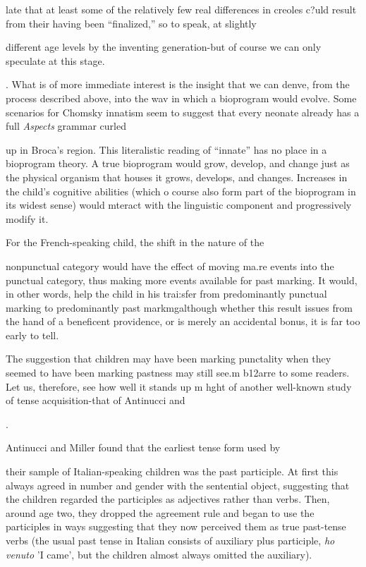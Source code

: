 late that at least some of the relatively few real differences in creoles c?uld result from their having been ``finalized,'' so to speak, at slightly

different age levels by the inventing generation-but of course we can only speculate at this stage.

. What is of more immediate interest is the insight that we can denve, from the process described above, into the wav in which a bio\-program would evolve. Some scenarios for Chomsky innatism seem to suggest that every neonate already has a full \textit{Aspects} grammar curled


up in Broca's region. This literalistic reading of ``innate'' has no place in a bioprogram theory. A true bioprogram would grow, develop, and change just as the physical organism that houses it grows, develops, and changes. Increases in the child's cognitive abilities (which o course also form part of the bioprogram in its widest sense) would mteract with the linguistic component and progressively modify it.

For the French-speaking child, the shift in the nature of the

nonpunctual category would have the effect of moving ma.re events into the punctual category, thus making more events available for past marking. It would, in other words, help the child in his trai:sfer from predominantly punctual marking to predominantly past markmg\-although whether this result issues from the hand of a beneficent providence, or is merely an accidental bonus, it is far too early to tell.

The suggestion that children may have been marking punctality when they seemed to have been marking pastness may still see.m b12arre to some readers. Let us, therefore, see how well it stands up m hght of another well-known study of tense acquisition-that of Antinucci and

\citet{Miller1976}.

Antinucci and Miller found that the earliest tense form used by

their sample of Italian-speaking children was the past participle. At first this always agreed in number and gender with the sentential object, suggesting that the children regarded the participles as adjectives rather than verbs. Then, around age two, they dropped the agreement rule and began to use the participles in ways suggesting that they now perceived them as true past-tense verbs (the usual past tense in Italian consists of auxiliary plus participle, \textit{ho venuto }'I came', but the children almost always omitted the auxiliary).

